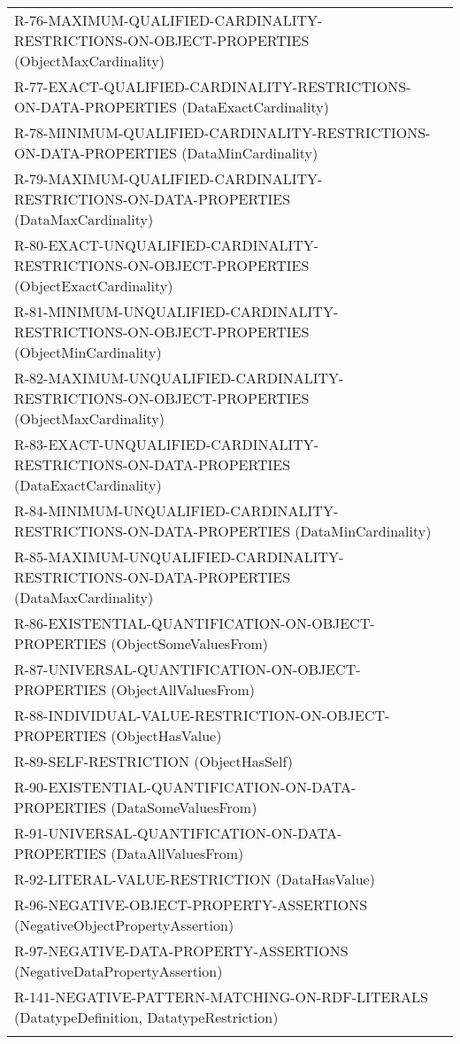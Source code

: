 \documentclass{llncs}
\newcommand{\hr}{\hline\noalign{\smallskip}} %
\begin{document}
\begin{table}
\begin{tabular}{ll}
R-76-MAXIMUM-QUALIFIED-CARDINALITY-RESTRICTIONS-ON-OBJECT-PROPERTIES (ObjectMaxCardinality) \\
R-77-EXACT-QUALIFIED-CARDINALITY-RESTRICTIONS-ON-DATA-PROPERTIES (DataExactCardinality) \\
R-78-MINIMUM-QUALIFIED-CARDINALITY-RESTRICTIONS-ON-DATA-PROPERTIES (DataMinCardinality) \\
R-79-MAXIMUM-QUALIFIED-CARDINALITY-RESTRICTIONS-ON-DATA-PROPERTIES (DataMaxCardinality) \\
R-80-EXACT-UNQUALIFIED-CARDINALITY-RESTRICTIONS-ON-OBJECT-PROPERTIES (ObjectExactCardinality) \\
R-81-MINIMUM-UNQUALIFIED-CARDINALITY-RESTRICTIONS-ON-OBJECT-PROPERTIES (ObjectMinCardinality) \\
R-82-MAXIMUM-UNQUALIFIED-CARDINALITY-RESTRICTIONS-ON-OBJECT-PROPERTIES (ObjectMaxCardinality) \\
R-83-EXACT-UNQUALIFIED-CARDINALITY-RESTRICTIONS-ON-DATA-PROPERTIES (DataExactCardinality) \\
R-84-MINIMUM-UNQUALIFIED-CARDINALITY-RESTRICTIONS-ON-DATA-PROPERTIES (DataMinCardinality) \\
R-85-MAXIMUM-UNQUALIFIED-CARDINALITY-RESTRICTIONS-ON-DATA-PROPERTIES (DataMaxCardinality) \\
R-86-EXISTENTIAL-QUANTIFICATION-ON-OBJECT-PROPERTIES (ObjectSomeValuesFrom) \\
R-87-UNIVERSAL-QUANTIFICATION-ON-OBJECT-PROPERTIES (ObjectAllValuesFrom) \\
R-88-INDIVIDUAL-VALUE-RESTRICTION-ON-OBJECT-PROPERTIES (ObjectHasValue) \\
R-89-SELF-RESTRICTION (ObjectHasSelf) \\
R-90-EXISTENTIAL-QUANTIFICATION-ON-DATA-PROPERTIES (DataSomeValuesFrom) \\
R-91-UNIVERSAL-QUANTIFICATION-ON-DATA-PROPERTIES (DataAllValuesFrom) \\
R-92-LITERAL-VALUE-RESTRICTION (DataHasValue) \\
R-96-NEGATIVE-OBJECT-PROPERTY-ASSERTIONS (NegativeObjectPropertyAssertion) \\
R-97-NEGATIVE-DATA-PROPERTY-ASSERTIONS (NegativeDataPropertyAssertion) \\
R-141-NEGATIVE-PATTERN-MATCHING-ON-RDF-LITERALS (DatatypeDefinition, DatatypeRestriction) \\
\hr
\end{tabular}
\end{table}
\end{document}
